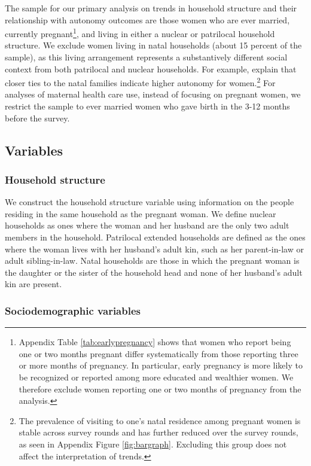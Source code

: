 \documentclass[10pt,twoside,reqno]{article}
\begin{document}
The sample for our primary analysis on trends in household structure and their relationship with autonomy outcomes are those women who are ever married, currently pregnant\footnote{Appendix Table \ref{tab:earlypregnancy} shows that women who report being one or two months pregnant differ systematically from those reporting three or more months of pregnancy. In particular, early pregnancy is more likely to be recognized or reported among more educated and wealthier women. We therefore exclude women reporting one or two months of pregnancy from the analysis.}, and living in either a nuclear or patrilocal household structure. We exclude women living in natal households (about 15 percent of the sample), as this living arrangement represents a substantively different social context from both patrilocal and nuclear households. For example, \cite{dyson1983kinship} explain that closer ties to the natal families indicate higher autonomy for women.\footnote{The prevalence of visiting to one's natal residence among pregnant women is stable across survey rounds and has further reduced over the survey rounds, as seen in Appendix Figure \ref{fig:bargraph}.  Excluding this group does not affect the interpretation of trends.} For analyses of maternal health care use, instead of focusing on pregnant women, we restrict the sample to ever married women who gave birth in the 3-12 months before the survey.

\subsection{Variables}

\subsubsection{Household structure}
We construct the household structure variable using information on the people residing in the same household as the pregnant woman. We define nuclear households as ones where the woman and her husband are the only two adult members in the household. Patrilocal extended households are defined as the ones where the woman lives with her husband’s adult kin, such as her parent-in-law or adult sibling-in-law. Natal households are those in which the pregnant woman is the daughter or the sister of the household head and none of her husband’s adult kin are present. 

\subsubsection{Sociodemographic variables}  
\end{document}
